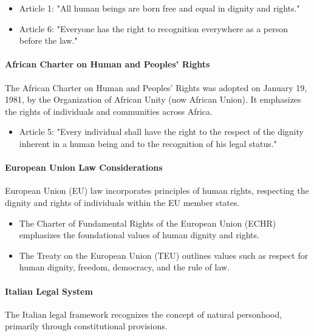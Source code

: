 \begin{itemize}[label=-]
    \item Article 1: "All human beings are born free and equal in dignity and rights."
    \item Article 6: "Everyone has the right to recognition everywhere as a person before the law."
\end{itemize}

\paragraph{African Charter on Human and Peoples' Rights}

The African Charter on Human and Peoples' Rights was adopted on January 19, 1981, by the Organization of African Unity (now African Union). It emphasizes the rights of individuals and communities across Africa.

\begin{itemize}[label=-]
    \item Article 5: "Every individual shall have the right to the respect of the dignity inherent in a human being and to the recognition of his legal status."
\end{itemize}

\paragraph{European Union Law Considerations}

European Union (EU) law incorporates principles of human rights, respecting the dignity and rights of individuals within the EU member states.

\begin{itemize}[label=-]
    \item The Charter of Fundamental Rights of the European Union (ECHR) emphasizes the foundational values of human dignity and rights.
    \item The Treaty on the European Union (TEU) outlines values such as respect for human dignity, freedom, democracy, and the rule of law.
\end{itemize}


\paragraph{Italian Legal System}
The Italian legal framework recognizes the concept of natural personhood, primarily through constitutional provisions.

